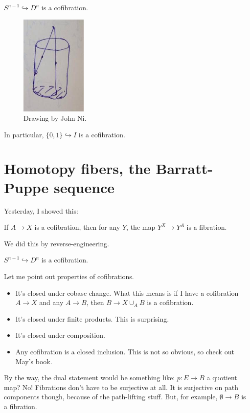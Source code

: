\begin{example}
    $S^{n-1}\hookrightarrow D^n$ is a cofibration.
    \begin{figure}[H]
	\centering
	\includegraphics[scale=0.75]{retract-cofibration}
	\caption{Drawing by John Ni.}
    \end{figure}
\end{example}
In particular, $\{0,1\}\hookrightarrow I$ is a cofibration.
\section{Homotopy fibers, the Barratt-Puppe sequence}
Yesterday, I showed this:
\begin{prop}
    If $A\to X$ is a cofibration, then for any $Y$, the map $Y^X\to Y^A$ is a fibration.
\end{prop}
We did this by reverse-engineering.
\begin{example}
    $S^{n-1}\hookrightarrow D^n$ is a cofibration.
\end{example}
Let me point out properties of cofibrations.
\begin{itemize}
    \item It's closed under cobase change. What this means is if I have a cofibration $A\to X$ and any $A\to B$, then $B\to X\cup_A B$ is a cofibration.
    \item It's closed under finite products. This is surprising.
    \item It's closed under composition.
    \item Any cofibration is a closed inclusion. This is not so obvious, so check out May's book.
\end{itemize}
By the way, the dual statement would be something like: $p:E\to B$ a quotient map? No! Fibrations don't have to be surjective at all. It is surjective on path components though, because of the path-lifting stuff. But, for example, $\emptyset\to B$ is a fibration.

